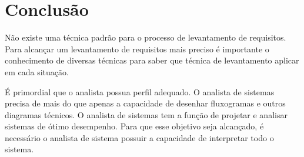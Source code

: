 \documentclass[12pt]{article}
\begin{document}
\section{Conclusão}

Não existe uma técnica padrão para o processo de levantamento de requisitos. Para alcançar um levantamento de requisitos mais preciso é importante o conhecimento de diversas técnicas para saber que técnica de levantamento aplicar em cada situação.

É primordial que o analista possua perfil adequado. O analista de sistemas precisa de mais do que apenas a capacidade de desenhar fluxogramas e outros diagramas técnicos. O analista de sistemas tem a função de projetar e analisar sistemas de ótimo desempenho. Para que esse objetivo seja alcançado, é necessário o analista de sistema possuir a capacidade de interpretar todo o sistema.





\end{document}
